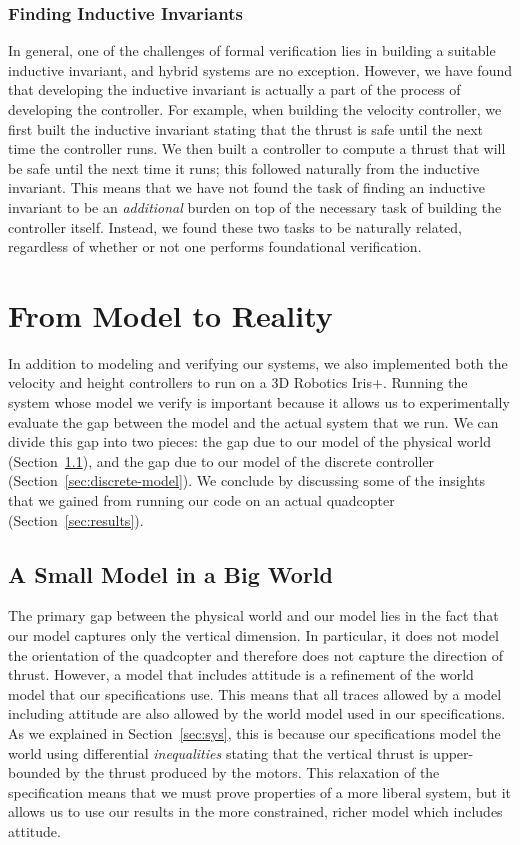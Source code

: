 \subsubsection*{Finding Inductive Invariants}
In general, one of the challenges of formal verification lies in building a
suitable inductive invariant, and hybrid systems are no exception.
However, we have found that developing the inductive invariant is actually
a part of the process of developing the controller.  For example, when
building the velocity controller, we first built the inductive invariant
stating that the thrust is safe until the next time the controller runs.
We then built a controller to compute a thrust that will be safe until the
next time it runs; this followed naturally from the inductive invariant.
This means that we have not found the task of finding an inductive
invariant to be an \emph{additional} burden on top of the necessary task of
building the controller itself. Instead, we found these two tasks to be
naturally related, regardless of whether or not one performs foundational
verification.

\section{From Model to Reality}
\label{sec:experiences}
In addition to modeling and verifying our systems, we also implemented both
the velocity and height controllers to run on a 3D Robotics Iris+.  Running
the system whose model we verify is important because it allows us to
experimentally evaluate the gap between the model and the actual system
that we run.  We can divide this gap into two pieces: the gap due to our
model of the physical world (Section~\ref{sec:world-model}), and the gap
due to our model of the discrete controller
(Section~\ref{sec:discrete-model}).  We conclude by discussing some of the
insights that we gained from running our code on an actual quadcopter
(Section~\ref{sec:results}).

\subsection{A Small Model in a Big World}
\label{sec:world-model}

The primary gap between the physical world and our model lies in the fact
that our model captures only the vertical dimension.  In particular, it
does not model the orientation of the quadcopter and therefore does not
capture the direction of thrust.  However, a model that includes attitude
is a refinement of the world model that our specifications use.  This means
that all traces allowed by a model including attitude are also allowed by
the world model used in our specifications.  As we explained in
Section~\ref{sec:sys}, this is because our specifications model the world
using differential \emph{inequalities} stating that the vertical thrust is
upper-bounded by the thrust produced by the motors.  This relaxation of the
specification means that we must prove properties of a more liberal system,
but it allows us to use our results in the more constrained, richer model
which includes attitude.

